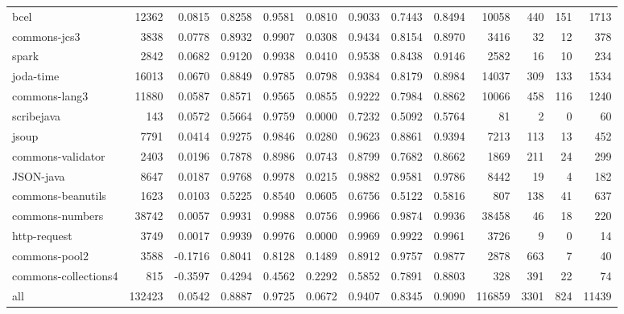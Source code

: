 \begin{table*}
\begin{tabular}{lrrrrrrrrrrrr}
                   bcel &   12362 &      0.0815 &  0.8258 &     0.9581 &     0.0810 &  0.9033 &     0.7443 &   0.8494 &   10058 &   440 &  151 &   1713 \\
           commons-jcs3 &    3838 &      0.0778 &  0.8932 &     0.9907 &     0.0308 &  0.9434 &     0.8154 &   0.8970 &    3416 &    32 &   12 &    378 \\
                  spark &    2842 &      0.0682 &  0.9120 &     0.9938 &     0.0410 &  0.9538 &     0.8438 &   0.9146 &    2582 &    16 &   10 &    234 \\
              joda-time &   16013 &      0.0670 &  0.8849 &     0.9785 &     0.0798 &  0.9384 &     0.8179 &   0.8984 &   14037 &   309 &  133 &   1534 \\
          commons-lang3 &   11880 &      0.0587 &  0.8571 &     0.9565 &     0.0855 &  0.9222 &     0.7984 &   0.8862 &   10066 &   458 &  116 &   1240 \\
             scribejava &     143 &      0.0572 &  0.5664 &     0.9759 &     0.0000 &  0.7232 &     0.5092 &   0.5764 &      81 &     2 &    0 &     60 \\
                  jsoup &    7791 &      0.0414 &  0.9275 &     0.9846 &     0.0280 &  0.9623 &     0.8861 &   0.9394 &    7213 &   113 &   13 &    452 \\
      commons-validator &    2403 &      0.0196 &  0.7878 &     0.8986 &     0.0743 &  0.8799 &     0.7682 &   0.8662 &    1869 &   211 &   24 &    299 \\
              JSON-java &    8647 &      0.0187 &  0.9768 &     0.9978 &     0.0215 &  0.9882 &     0.9581 &   0.9786 &    8442 &    19 &    4 &    182 \\
      commons-beanutils &    1623 &      0.0103 &  0.5225 &     0.8540 &     0.0605 &  0.6756 &     0.5122 &   0.5816 &     807 &   138 &   41 &    637 \\
        commons-numbers &   38742 &      0.0057 &  0.9931 &     0.9988 &     0.0756 &  0.9966 &     0.9874 &   0.9936 &   38458 &    46 &   18 &    220 \\
           http-request &    3749 &      0.0017 &  0.9939 &     0.9976 &     0.0000 &  0.9969 &     0.9922 &   0.9961 &    3726 &     9 &    0 &     14 \\
          commons-pool2 &    3588 &     -0.1716 &  0.8041 &     0.8128 &     0.1489 &  0.8912 &     0.9757 &   0.9877 &    2878 &   663 &    7 &     40 \\
   commons-collections4 &     815 &     -0.3597 &  0.4294 &     0.4562 &     0.2292 &  0.5852 &     0.7891 &   0.8803 &     328 &   391 &   22 &     74 \\
                    all &  132423 &      0.0542 &  0.8887 &     0.9725 &     0.0672 &  0.9407 &     0.8345 &   0.9090 &  116859 &  3301 &  824 &  11439 \\
\bottomrule
\end{tabular}
\end{table*}
